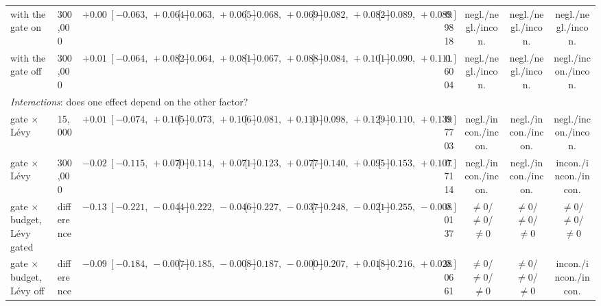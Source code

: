 \begin{table}[htbp]
{\begin{tabular}{llrccccccccc}
\quad with the gate on & 300{,}000 & $+0.000$ & $[-0.063,\,+0.064]$ & $[-0.063,\,+0.065]$ & $[-0.068,\,+0.069]$ & $[-0.082,\,+0.082]$ & $[-0.089,\,+0.089]$ & 0.9818 & negl./negl./incon. & negl./negl./incon. & negl./negl./incon. \\
\quad with the gate off & 300{,}000 & $+0.011$ & $[-0.064,\,+0.082]$ & $[-0.064,\,+0.081]$ & $[-0.067,\,+0.088]$ & $[-0.084,\,+0.101]$ & $[-0.090,\,+0.111]$ & 0.6004 & negl./negl./incon. & negl./negl./incon. & negl./incon./incon. \\
\midrule
\multicolumn{12}{l}{\emph{Interactions}: does one effect depend on the other factor?} \\
\quad gate $\times$ L\'evy & 15{,}000 & $+0.015$ & $[-0.074,\,+0.105]$ & $[-0.073,\,+0.106]$ & $[-0.081,\,+0.110]$ & $[-0.098,\,+0.129]$ & $[-0.110,\,+0.139]$ & 0.7703 & negl./incon./incon. & negl./incon./incon. & negl./incon./incon. \\
\quad gate $\times$ L\'evy & 300{,}000 & $-0.023$ & $[-0.115,\,+0.070]$ & $[-0.114,\,+0.071]$ & $[-0.123,\,+0.077]$ & $[-0.140,\,+0.095]$ & $[-0.153,\,+0.107]$ & 0.7114 & negl./incon./incon. & negl./incon./incon. & incon./incon./incon. \\
\quad gate $\times$ budget, L\'evy gated & difference & $-0.132$ & $[-0.221,\,-0.044]$ & $[-0.222,\,-0.046]$ & $[-0.227,\,-0.037]$ & $[-0.248,\,-0.021]$ & $[-0.255,\,-0.008]$ & 0.0137 & $\neq0$/$\neq0$/$\neq0$ & $\neq0$/$\neq0$/$\neq0$ & $\neq0$/$\neq0$/$\neq0$ \\
\quad gate $\times$ budget, L\'evy off & difference & $-0.094$ & $[-0.184,\,-0.007]$ & $[-0.185,\,-0.008]$ & $[-0.187,\,-0.000]$ & $[-0.207,\,+0.018]$ & $[-0.216,\,+0.028]$ & 0.0661 & $\neq0$/$\neq0$/$\neq0$ & $\neq0$/$\neq0$/$\neq0$ & incon./incon./incon. \\
\bottomrule
\end{tabular}}
\begin{flushleft}\footnotesize

\end{flushleft}
\end{table}

